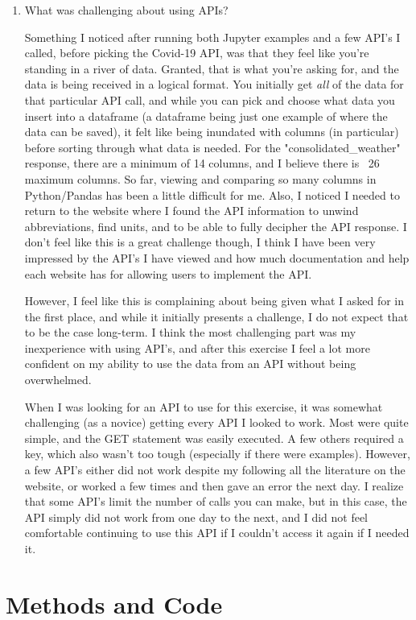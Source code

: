 \documentclass[]{article}
\begin{document}
\begin{enumerate}
	\item What was challenging about using APIs?
	
	Something I noticed after running both Jupyter examples and a few API's I called, before picking the Covid-19 API, was that they feel like you're standing in a river of data.  Granted, that is what you're asking for, and the data is being received in a logical format.  You initially get \textit{all} of the data for that particular API call, and while you can pick and choose what data you insert into a dataframe (a dataframe being just one example of where the data can be saved), it felt like being inundated with columns (in particular) before sorting through what data is needed. For the "consolidated\_weather" response, there are a minimum of 14 columns, and I believe there is ~26 maximum columns.  So far, viewing and comparing so many columns in Python/Pandas has been a little difficult for me.  Also, I noticed I needed to return to the website where I found the API information to unwind abbreviations, find units, and to be able to fully decipher the API response.  I don't feel like this is a great challenge though, I think I have been very impressed by the API's I have viewed and how much documentation and help each website has for allowing users to implement the API.
	
	However, I feel like this is complaining about being given what I asked for in the first place, and while it initially presents a challenge, I do not expect that to be the case long-term.  I think the most challenging part was my inexperience with using API's, and after this exercise I feel a lot more confident on my ability to use the data from an API without being overwhelmed.
	
	When I was looking for an API to use for this exercise, it was somewhat challenging (as a novice) getting every API I looked to work.  Most were quite simple, and the GET statement was easily executed.  A few others required a key, which also wasn't too tough (especially if there were examples).  However, a few API's either did not work despite my following all the literature on the website, or worked a few times and then gave an error the next day.  I realize that some API's limit the number of calls you can make, but in this case, the API simply did not work from one day to the next, and I did not feel comfortable continuing to use this API if I couldn't access it again if I needed it.  
\end{enumerate}

\section{Methods and Code}
\end{document}
